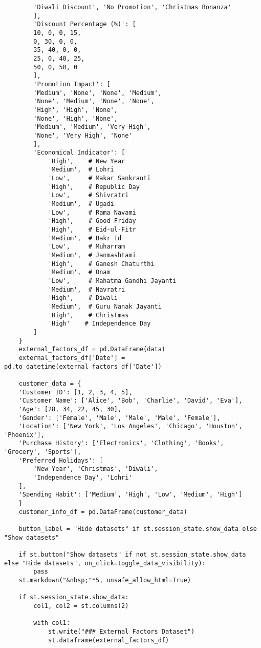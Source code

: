 \documentclass[10pt]{report}
\begin{document}
\begin{center}
\begin{lstlisting}
        'Diwali Discount', 'No Promotion', 'Christmas Bonanza'
        ],
        'Discount Percentage (%)': [
        10, 0, 0, 15, 
        0, 30, 0, 0, 
        35, 40, 0, 0, 
        25, 0, 40, 25, 
        50, 0, 50, 0
        ],
        'Promotion Impact': [
        'Medium', 'None', 'None', 'Medium', 
        'None', 'Medium', 'None', 'None', 
        'High', 'High', 'None', 
        'None', 'High', 'None', 
        'Medium', 'Medium', 'Very High', 
        'None', 'Very High', 'None'
        ],
        'Economical Indicator': [
            'High',    # New Year
            'Medium',  # Lohri
            'Low',     # Makar Sankranti
            'High',    # Republic Day
            'Low',     # Shivratri
            'Medium',  # Ugadi
            'Low',     # Rama Navami
            'High',    # Good Friday
            'High',    # Eid-ul-Fitr
            'Medium',  # Bakr Id
            'Low',     # Muharram
            'Medium',  # Janmashtami
            'High',    # Ganesh Chaturthi
            'Medium',  # Onam
            'Low',     # Mahatma Gandhi Jayanti
            'Medium',  # Navratri
            'High',    # Diwali
            'Medium',  # Guru Nanak Jayanti
            'High',    # Christmas
            'High'    # Independence Day
        ]
    }
    external_factors_df = pd.DataFrame(data)
    external_factors_df['Date'] = pd.to_datetime(external_factors_df['Date'])

    customer_data = {
    'Customer ID': [1, 2, 3, 4, 5],
    'Customer Name': ['Alice', 'Bob', 'Charlie', 'David', 'Eva'],
    'Age': [28, 34, 22, 45, 30],
    'Gender': ['Female', 'Male', 'Male', 'Male', 'Female'],
    'Location': ['New York', 'Los Angeles', 'Chicago', 'Houston', 'Phoenix'],
    'Purchase History': ['Electronics', 'Clothing', 'Books', 'Grocery', 'Sports'],
    'Preferred Holidays': [
        'New Year', 'Christmas', 'Diwali', 
        'Independence Day', 'Lohri'
    ],
    'Spending Habit': ['Medium', 'High', 'Low', 'Medium', 'High']
    }
    customer_info_df = pd.DataFrame(customer_data)

    button_label = "Hide datasets" if st.session_state.show_data else "Show datasets"

    if st.button("Show datasets" if not st.session_state.show_data else "Hide datasets", on_click=toggle_data_visibility):
        pass
    st.markdown("&nbsp;"*5, unsafe_allow_html=True)

    if st.session_state.show_data:
        col1, col2 = st.columns(2)
    
        with col1:
            st.write("### External Factors Dataset")
            st.dataframe(external_factors_df)


\end{lstlisting}
\end{center}
\end{document}
